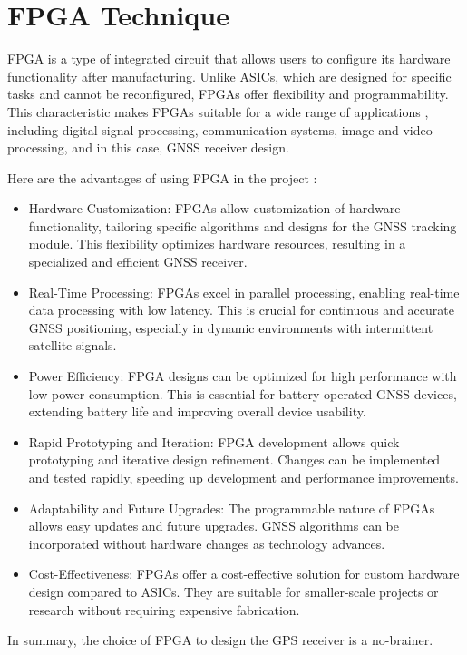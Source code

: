 \section{FPGA Technique}
FPGA is a type of integrated circuit that allows users to configure its hardware functionality after manufacturing. Unlike ASICs, which are designed for specific tasks and cannot be reconfigured, FPGAs offer flexibility and programmability. This characteristic makes FPGAs suitable for a wide range of applications \cite{RN185}, including digital signal processing, communication systems, image and video processing, and in this case, GNSS receiver design.

Here are the advantages of using FPGA in the project \cite{RN186}:
\begin{itemize}
    \item Hardware Customization: FPGAs allow customization of hardware functionality, tailoring specific algorithms and designs for the GNSS tracking module. This flexibility optimizes hardware resources, resulting in a specialized and efficient GNSS receiver.
    \item Real-Time Processing: FPGAs excel in parallel processing, enabling real-time data processing with low latency. This is crucial for continuous and accurate GNSS positioning, especially in dynamic environments with intermittent satellite signals.
    \item Power Efficiency: FPGA designs can be optimized for high performance with low power consumption. This is essential for battery-operated GNSS devices, extending battery life and improving overall device usability.
    \item Rapid Prototyping and Iteration: FPGA development allows quick prototyping and iterative design refinement. Changes can be implemented and tested rapidly, speeding up development and performance improvements.
    \item Adaptability and Future Upgrades: The programmable nature of FPGAs allows easy updates and future upgrades. GNSS algorithms can be incorporated without hardware changes as technology advances.
    \item Cost-Effectiveness: FPGAs offer a cost-effective solution for custom hardware design compared to ASICs. They are suitable for smaller-scale projects or research without requiring expensive fabrication.
\end{itemize}

In summary, the choice of FPGA to design the GPS receiver is a no-brainer.